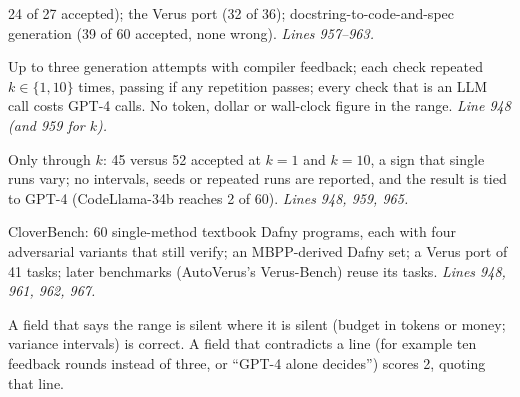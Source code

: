 \documentclass[11pt]{article}
\begin{document}
\begin{description}
  24 of 27 accepted); the Verus port (32 of 36); docstring-to-code-and-spec
  generation (39 of 60 accepted, none wrong). \emph{Lines 957--963.}
\item[Budget.] Up to three generation attempts with compiler feedback; each
  check repeated $k \in \{1, 10\}$ times, passing if any repetition passes;
  every check that is an LLM call costs GPT-4 calls. No token, dollar or
  wall-clock figure in the range. \emph{Line 948 (and 959 for $k$).}
\item[Variance.] Only through $k$: 45 versus 52 accepted at $k = 1$ and
  $k = 10$, a sign that single runs vary; no intervals, seeds or repeated
  runs are reported, and the result is tied to GPT-4 (CodeLlama-34b reaches
  2 of 60). \emph{Lines 948, 959, 965.}
\item[Artifact.] CloverBench: 60 single-method textbook Dafny programs, each
  with four adversarial variants that still verify; an MBPP-derived Dafny set;
  a Verus port of 41 tasks; later benchmarks (AutoVerus's Verus-Bench) reuse
  its tasks. \emph{Lines 948, 961, 962, 967.}
\end{description}
A field that says the range is silent where it is silent (budget in tokens or
money; variance intervals) is correct. A field that contradicts a line (for
example ten feedback rounds instead of three, or ``GPT-4 alone decides'')
scores 2, quoting that line.
\end{document}
